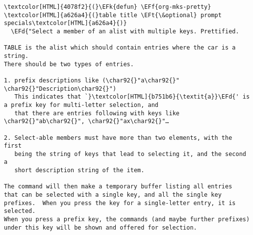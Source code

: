 \documentclass{scrartcl}
\newcommand{\EFk}[1]{\textcolor{EFk}{#1}} %
\newcommand{\EFd}[1]{\textcolor{EFd}{\textit{#1}}} %
\newcommand{\EFt}[1]{\textcolor{EFt}{#1}} %
\newcommand{\EFf}[1]{\textcolor{EFf}{#1}} %
\begin{document}
\begin{Code}
\begin{Verbatim}[]
\textcolor[HTML]{4078f2}{(}\EFk{defun} \EFf{org-mks-pretty} \textcolor[HTML]{a626a4}{(}table title \EFt{\&optional} prompt specials\textcolor[HTML]{a626a4}{)}
  \EFd{"Select a member of an alist with multiple keys. Prettified.

TABLE is the alist which should contain entries where the car is a string.
There should be two types of entries.

1. prefix descriptions like (\char92{}"a\char92{}" \char92{}"Description\char92{}")
   This indicates that `}\textcolor[HTML]{b751b6}{\textit{a}}\EFd{' is a prefix key for multi-letter selection, and
   that there are entries following with keys like \char92{}"ab\char92{}", \char92{}"ax\char92{}"…

2. Select-able members must have more than two elements, with the first
   being the string of keys that lead to selecting it, and the second a
   short description string of the item.

The command will then make a temporary buffer listing all entries
that can be selected with a single key, and all the single key
prefixes.  When you press the key for a single-letter entry, it is selected.
When you press a prefix key, the commands (and maybe further prefixes)
under this key will be shown and offered for selection.


\end{Verbatim}
\end{Code}
\end{document}
